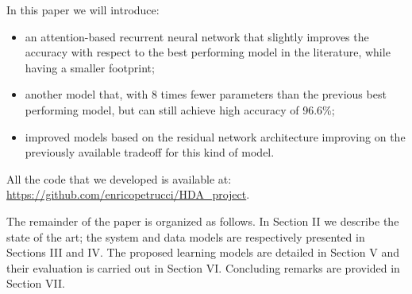 In this paper we will introduce:
\begin{itemize}
  \item an attention-based recurrent neural network that slightly improves the accuracy with respect to the best performing model in the literature, while having a smaller footprint; 

  \item another model that, with 8 times fewer parameters than the previous best performing model, but can still achieve high accuracy of 96.6\%;
  \item improved models based on the residual network architecture improving on the previously available tradeoff for this kind of model.

\end{itemize}

All the code that we developed is available at: \url{https://github.com/enricopetrucci/HDA_project}.

The remainder of the paper is organized as follows. In Section II we describe the state of the art; the system and data models are respectively presented in Sections III and IV. The proposed learning models are detailed in Section V and their evaluation is carried out in Section VI.
Concluding remarks are provided in Section VII.
